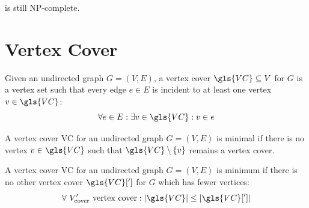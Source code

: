 
\begin{theorem}
   is still NP-complete.~\cite{planar_3SAT}
\end{theorem}

\section{Vertex Cover}

\begin{definition}
  \label{def:vertex_cover}
  Given an undirected graph \(G=(V,E)\), a vertex cover
  \(\gls{VC} \subseteq V\) for \(G\) is a vertex set such that
  every edge \(e \in E\) is incident to at least one vertex
  \(v \in \gls{VC}\):
  \[ \forall e \in E: \exists v \in \gls{VC}: v \in e \]
\end{definition}


\begin{definition}
  A vertex cover \gls{VC} for an undirected graph
  \(G=(V,E)\) is minimal if there is no vertex
  \(v \in \gls{VC}\) such that
  \(\gls{VC} \setminus \{v\}\) remains a vertex cover.
\end{definition}


\begin{definition}
  A vertex cover \gls{VC} for an undirected graph
  \(G=(V,E)\) is minimum if there is no other vertex cover
  \(\gls{VC}[']\) for \(G\) which has fewer vertices:
  \[
    \forall~V_{\text{cover}}'\text{ vertex cover} :
    |\gls{VC}| \leq |\gls{VC}[']|
  \]
\end{definition}

